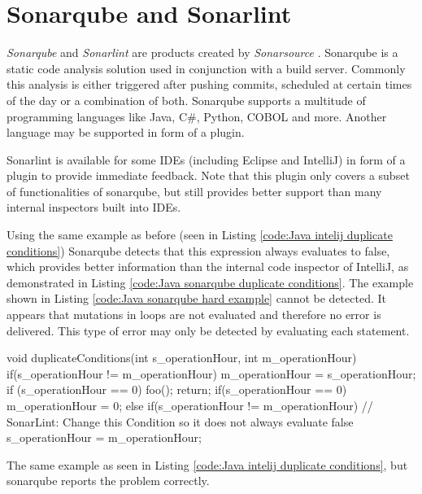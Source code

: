 \section{Sonarqube and Sonarlint} %
\label{sec:sonar}
\emph{Sonarqube} \cite{sonarqube} and \emph{Sonarlint} \cite{SonarLintFixIssues} are products created by \emph{Sonarsource} \cite{CodeQualityCode}. Sonarqube is a static code analysis solution used in conjunction with a build server.
Commonly this analysis is either triggered after pushing commits, scheduled at certain times of the day or a combination of both.
Sonarqube supports a multitude of programming languages like Java, C\#, Python, COBOL and more. Another language may be supported in form of a plugin.


Sonarlint is available for some IDEs (including Eclipse and IntelliJ) in form of a plugin to provide immediate feedback. Note that this plugin only covers a subset of functionalities of sonarqube, but still provides better support than many internal inspectors built into IDEs.

\newpage
Using the same example as before (seen in Listing \ref{code:Java intelij duplicate conditions}) Sonarqube detects that this expression always evaluates to false, which provides better information than the internal code inspector of IntelliJ, as demonstrated in Listing \ref{code:Java sonarqube duplicate conditions}. The example shown in Listing \ref{code:Java sonarqube hard example} cannot be detected. It appears that mutations in loops are not evaluated and therefore no error is delivered. This type of error may only be detected by evaluating each statement.


\begin{program}[h!]
	\begin{JavaCode}
void duplicateConditions(int s_operationHour, int m_operationHour) {
	if(s_operationHour != m_operationHour) {
		m_operationHour = s_operationHour;
		if (s_operationHour == 0) {
			foo();        
		}
		return;
	}
	if(s_operationHour == 0) {
		m_operationHour = 0;
	} else {
		if(s_operationHour != m_operationHour) { // SonarLint: Change this Condition so it does not always evaluate false
			s_operationHour = m_operationHour;
		}
	}
}\end{JavaCode}
	\caption{The same example as seen in Listing \ref{code:Java intelij duplicate conditions}, but sonarqube reports the problem correctly. }
	\label{code:Java sonarqube duplicate conditions}
\end{program}

